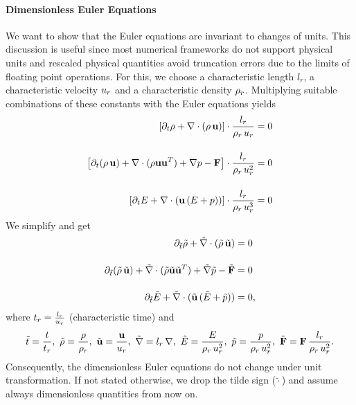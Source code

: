 \paragraph{Dimensionless Euler Equations} We want to show that the Euler
equations are invariant to changes of units. This discussion is useful since
most numerical frameworks do not support physical units and rescaled physical
quantities avoid truncation errors due to the limits of floating point
operations. For this, we choose a characteristic length $l_r$, a characteristic
velocity $u_r$ and a characteristic density $\rho_r$. Multiplying suitable 
combinations of these constants with the Euler equations yields
\begin{align}
\left[\partial_t\rho + \nabla \cdot (\rho\,\mathbf{u})\right] \cdot \frac{l_r}{\rho_r\,u_r} &=  0\\[0.4cm]
\left[\partial_t(\rho\,\mathbf{u}) + \nabla\cdot(\rho\mathbf{u}\mathbf{u}^T) + \nabla p - \mathbf{F}\right] \cdot \frac{l_r}{\rho_r\,u_r^2} &= 0\\[0.4cm]
\left[\partial_t E + \nabla \cdot (\mathbf{u}\,(E + p))\right] \cdot \frac{l_r}{\rho_r\,u_r^3} &=  0
\end{align}
We simplify and get
\begin{align}
\partial_{\tilde{t}} \tilde{\rho} + \tilde{\nabla} \cdot (\tilde{\rho}\,\tilde{\mathbf{u}})   &=  0\\[0.4cm]
\partial_{\tilde{t}}(\tilde{\rho} \,\tilde{\mathbf{u}}) +      \tilde{\nabla}\cdot(\tilde{\rho}\tilde{\mathbf{u}}\tilde{\mathbf{u}}^T) + \tilde{\nabla} \tilde{p} - \tilde{\mathbf{F}}&= 0\\[0.4cm]
\partial_{\tilde{t}} \tilde{E} + \tilde{\nabla} \cdot (\tilde{\mathbf{u}}\,(\tilde{E} + \tilde{p})) &=  0,
\end{align}
where $t_r = \frac{l_r}{u_r}$ (characteristic time) and
\begin{equation}
\tilde{t} = \frac{t}{t_r},\ 
\tilde{\dens} = \frac{\dens}{\dens_r},\
\tilde{\velv} = \frac{\velv}{\vels_r},\ 
\tilde{\nabla} = l_r\,\nabla,\ 
\tilde{\Ener} = \frac{\Ener}{\dens_r\,\vels_r^2},\ 
\tilde{\pres} = \frac{\pres}{\dens_r\,\vels_r^2},\ 
\tilde{\vec{F}} = \vec{F} \, \frac{l_r}{\dens_r\,\vels_r^2}.
\end{equation}
Consequently, the dimensionless Euler equations do not change under unit transformation. If not
stated otherwise, we drop the tilde sign ($\tilde{\cdot}$) and assume always
dimensionless quantities from now on.

